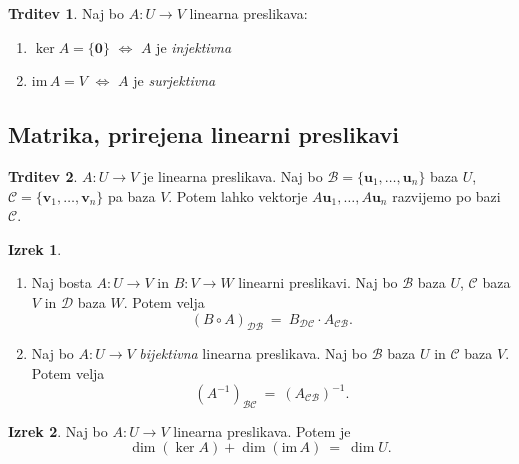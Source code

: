 \documentclass[11pt]{article}
\renewcommand{\u}{\mathbf{u}}
\newcommand{\vv}{\mathbf{v}}
\newcommand{\0}{\mathbf{0}}
\newcommand{\im}{\text{im}\,}
\newcommand{\B}{\mathscr{B}}
\newcommand{\C}{\mathscr{C}}
\newcommand{\D}{\mathscr{D}}
\theoremstyle{definition}
\theoremstyle{definition}
\newtheorem{trditev}{Trditev}[section]
\theoremstyle{definition}
\newtheorem{izrek}{Izrek}[section]
\theoremstyle{definition}
\begin{document}
\begin{trditev}

Naj bo $A: U \rightarrow V$ linearna preslikava:
\begin{enumerate}
	\item $\ker A = \{\0\}$ $\iff$ $A$ je \textit{injektivna}
	\item $\im A = V$ $\iff$ $A$ je \textit{surjektivna}
\end{enumerate}

\end{trditev}
\vspace{0.5cm}


\subsection{Matrika, prirejena linearni preslikavi}
\vspace{0.5cm}

\begin{trditev}

$A: U \rightarrow V$ je linearna preslikava. Naj bo $\B = \{\u_1,\ldots,\u_n\}$ baza $U$, $\C = \{\vv_1,\ldots,\vv_n\}$ pa baza $V$. Potem lahko vektorje $A\u_1,\ldots,A\u_n$ razvijemo po bazi $\C$.

\end{trditev}
\vspace{0.5cm}

\begin{izrek}
~
\begin{enumerate}
	
	\item Naj bosta $A: U \rightarrow V$ in $B: V \rightarrow W$ linearni preslikavi. Naj bo $\B$ baza $U$, $\C$ baza $V$ in $\D$ baza $W$. Potem velja
	$$(B \circ A)_{\D\B} ~=~ B_{\D\C} \cdot A_{\C\B}.$$
	
	\item Naj bo $A: U \rightarrow V$ \textit{bijektivna} linearna preslikava. Naj bo $\B$ baza $U$ in $\C$ baza $V$. Potem velja
	$$\left(A^{-1}\right)_{\B\C} ~=~ \left(A_{\C\B}\right)^{-1}.$$	
		
\end{enumerate}

\end{izrek}
\vspace{0.5cm}

\begin{izrek}

Naj bo $A: U \rightarrow V$ linearna preslikava. Potem je
$$\dim (\ker A) + \dim (\im A) ~=~ \dim U.$$

\end{izrek}
\vspace{0.5cm}
\end{document}
